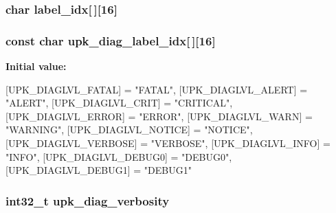 \subsubsection[{label\_\-idx}]{\setlength{\rightskip}{0pt plus 5cm}char {\bf label\_\-idx}[$\,$][16]}\label{group__upk__errors_ga9d2bce202c2ba97f9c8c02d46857552a}
\subsubsection[{upk\_\-diag\_\-label\_\-idx}]{\setlength{\rightskip}{0pt plus 5cm}const char {\bf upk\_\-diag\_\-label\_\-idx}[$\,$][16]\hspace{0.3cm}{\ttfamily  [static]}}\label{group__upk__errors_gae422812b612ba3ecf5f411f023416c38}
{\bfseries Initial value:}
\begin{DoxyCode}
 {
    [UPK_DIAGLVL_FATAL] = "FATAL",
    [UPK_DIAGLVL_ALERT] = "ALERT",
    [UPK_DIAGLVL_CRIT] = "CRITICAL",
    [UPK_DIAGLVL_ERROR] = "ERROR",
    [UPK_DIAGLVL_WARN] = "WARNING",
    [UPK_DIAGLVL_NOTICE] = "NOTICE",
    [UPK_DIAGLVL_VERBOSE] = "VERBOSE",
    [UPK_DIAGLVL_INFO] = "INFO",
    [UPK_DIAGLVL_DEBUG0] = "DEBUG0",
    [UPK_DIAGLVL_DEBUG1] = "DEBUG1"
}
\end{DoxyCode}
\subsubsection[{upk\_\-diag\_\-verbosity}]{\setlength{\rightskip}{0pt plus 5cm}int32\_\-t {\bf upk\_\-diag\_\-verbosity}}\label{group__upk__errors_gad9883b6b44bf3fa3e1abac4266ca1b65}
